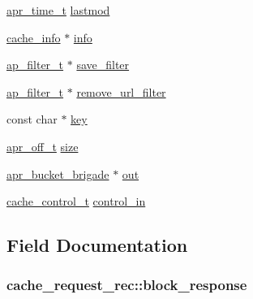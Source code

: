 \begin{DoxyCompactItemize}
\item 
\hyperlink{group__apr__time_gadb4bde16055748190eae190c55aa02bb}{apr\+\_\+time\+\_\+t} \hyperlink{structcache__request__rec_abca5c3e50a62f79dd48968dda7004742}{lastmod}
\item 
\hyperlink{structcache__info}{cache\+\_\+info} $\ast$ \hyperlink{structcache__request__rec_abb4fff9ba6faf382e1e65a8701390ecf}{info}
\item 
\hyperlink{structap__filter__t}{ap\+\_\+filter\+\_\+t} $\ast$ \hyperlink{structcache__request__rec_adaf100bf07271e1883c1fd68078f6384}{save\+\_\+filter}
\item 
\hyperlink{structap__filter__t}{ap\+\_\+filter\+\_\+t} $\ast$ \hyperlink{structcache__request__rec_a15d3f6cb91db63e45b9de2d427da632f}{remove\+\_\+url\+\_\+filter}
\item 
const char $\ast$ \hyperlink{structcache__request__rec_a564726b5f7e5dc4fee2fb01d178677b4}{key}
\item 
\hyperlink{group__apr__platform_ga6938af9075cec15c88299109381aa984}{apr\+\_\+off\+\_\+t} \hyperlink{structcache__request__rec_aac0684eb7c5ce3d11a2b7f308fd44be1}{size}
\item 
\hyperlink{structapr__bucket__brigade}{apr\+\_\+bucket\+\_\+brigade} $\ast$ \hyperlink{structcache__request__rec_a15d6a694a07d08709ea9f2478d963806}{out}
\item 
\hyperlink{group__Cache__cache_ga974ed8fda97372a8db4010093bf933c2}{cache\+\_\+control\+\_\+t} \hyperlink{structcache__request__rec_aaea78b272eb05f1ba67a75bd6264b4df}{control\+\_\+in}
\end{DoxyCompactItemize}


\subsection{Field Documentation}
\subsubsection[{\texorpdfstring{block\+\_\+response}{block_response}}]{ cache\+\_\+request\+\_\+rec\+::block\+\_\+response}\hypertarget{structcache__request__rec_aabb09b84eacc656fcf093e3038a5a315}{}\label{structcache__request__rec_aabb09b84eacc656fcf093e3038a5a315}
